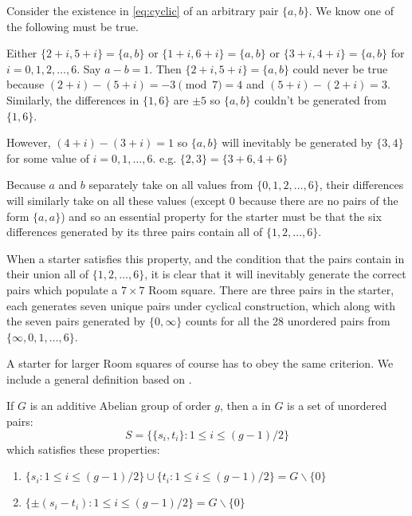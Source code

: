 Consider the existence in \eqref{eq:cyclic} of an arbitrary pair $\{a, b\}$.
We know one of the following must be true.

Either $\{2 + i, 5 + i\} = \{a, b\}$ or $\{1 + i, 6 + i\} = \{a, b\}$ or $\{3 + i, 4 + i\} = \{a, b\}$ for $i = 0, 1, 2, \ldots, 6$.
Say $a - b = 1$.
Then $\{2 + i, 5 + i\} = \{a, b\}$ could never be true because $(2 + i) - (5 + i) = -3\pmod 7 = 4$ and $(5 + i) - (2 + i) = 3$.
Similarly, the differences in $\{1, 6\}$ are $\pm 5$ so $\{a, b\}$ couldn’t be generated from $\{1, 6\}$.

However, $(4 + i) - (3 + i) = 1$ so $\{a, b\}$ will inevitably be generated by $\{3, 4\}$ for some value of $i = 0, 1, \ldots, 6$.
e.g. $\{2, 3\} = \{3 + 6, 4 + 6\}$

Because $a$ and $b$ separately take on all values from $\{0, 1, 2, \ldots, 6\}$, their differences will similarly take on all these values (except 0 because there are no pairs of the form $\{a, a\}$) and so an essential property for the starter must be that the six differences generated by its three pairs contain all of $\{1, 2, \ldots, 6\}$.

When a starter satisfies this property, and the condition that the pairs contain in their union all of $\{1, 2, \ldots, 6\}$, it is clear that it will inevitably generate the correct pairs which populate a $7 \times 7$ Room square. 
There are three pairs in the starter, each generates seven unique pairs under cyclical construction, which along with the seven pairs generated by $\{0, \infty\}$ counts for all the 28 unordered pairs from $\{\infty, 0, 1, \ldots, 6\}$.

A starter for larger Room squares of course has to obey the same criterion.
We include a general definition based on
\cite{dinitzContemporaryDesignTheory1992}.

If $G$ is an additive Abelian group of order $g$, then a  in $G$ is a set of unordered pairs:
\begin{equation*}
S = \{\{s_i, t_i\}:1 \leq i \leq (g - 1)/2\}
\end{equation*}
which satisfies these properties:

\begin{enumerate}
  \item{$\{s_i:1 \leq i \leq (g-1)/2\} \cup \{t_i : 1 \leq i \leq (g-1)/2\} = G \backslash \{0\}$}
  \item{$\{\pm (s_i - t_i ) : 1 \leq i \leq (g-1)/2 \} = G \backslash \{0\}$}
\end{enumerate}

